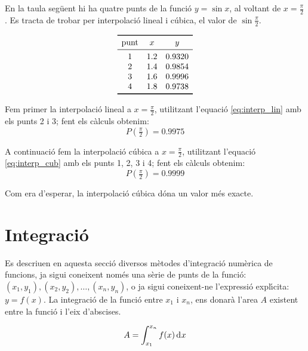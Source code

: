 \begin{exemple}
    En la taula seg\"{u}ent hi ha quatre punts de la funci\'{o} $y = \sin x$, al voltant de $x=\frac{\pi}{2}$. Es tracta de trobar per interpolaci\'{o} lineal i c\'{u}bica, el valor de $\sin \frac{\pi}{2}$.
    \vspace{-8mm}
    \begin{center}
        \[\begin{array}{ccc}
           \toprule[1pt]
              \text{punt} & x  & y \\
           \midrule
              1 & \num{1,2} & \num{0,9320} \\
              2 & \num{1,4} & \num{0,9854} \\
              3 & \num{1,6} & \num{0,9996} \\
              4 & \num{1,8} & \num{0,9738} \\
           \bottomrule[1pt]
        \end{array} \]
    \end{center}

    Fem primer la interpolaci\'{o} lineal a $x= \frac{\pi}{2}$, utilitzant l'equaci\'{o} \eqref{eq:interp_lin} amb els punts 2 i 3; fent els c\`{a}lculs obtenim:
    \[ P\left(\tfrac{\pi}{2}\right) = \num{0,9975} \]

    A continuaci\'{o} fem la interpolaci\'{o} c\'{u}bica a $x= \frac{\pi}{2}$, utilitzant l'equaci\'{o} \eqref{eq:interp_cub} amb els punts 1, 2, 3 i 4; fent els c\`{a}lculs obtenim:
    \[ P\left(\tfrac{\pi}{2}\right) = \num{0,9999} \]

    Com era d'esperar, la interpolaci\'{o} c\'{u}bica d\'{o}na un valor m\'{e}s exacte.
\end{exemple}


\section{Integraci\'{o}}

Es descriuen en aquesta secci\'{o} diversos m\`{e}todes d'integraci\'{o} num\`{e}rica de funcions, ja sigui coneixent nom\'{e}s una s\`{e}rie de punts de la funci\'{o}: $(x_1, y_1), (x_2, y_2), \dots ,(x_n, y_n)$, o ja sigui coneixent-ne l'expressi\'{o} expl\'{\i}cita: $y=f(x)$. La integraci\'{o} de la funci\'{o} entre $x_1$ i $x_n$, ens donar\`{a} l'area $A$ existent entre la funci\'{o} i l'eix d'abscises.

 \begin{equation}
    A = \int_{x_1}^{x_n} f(x) \diff x
 \end{equation}

